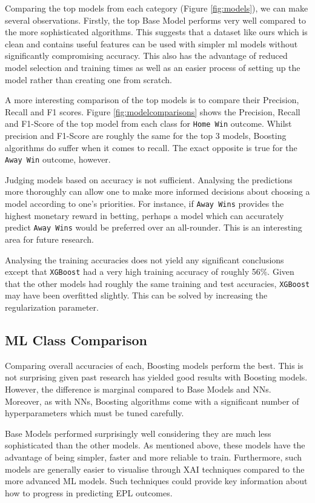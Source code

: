 \documentclass{article}
\newcommand{\sw}[1]{\texttt{#1}}
\begin{document}
Comparing the top models from each category (Figure \ref{fig:models}), we can make several observations. Firstly, the top Base Model performs very well compared to the more sophisticated algorithms. This suggests that a dataset like ours which is clean and contains useful features can be used with simpler \gls{ml} models without significantly compromising accuracy. This also has the advantage of reduced model selection and training times as well as an easier process of setting up the model rather than creating one from scratch.  

A more interesting comparison of the top models is to compare their Precision, Recall and F1 scores. Figure \ref{fig:modelcomparisons} shows the Precision, Recall and F1-Score of the top model from each class for \sw{Home Win} outcome. Whilst precision and F1-Score are roughly the same for the top 3 models, Boosting algorithms do suffer when it comes to recall. The exact opposite is true for the \sw{Away Win} outcome, however.  

Judging models based on accuracy is not sufficient. Analysing the predictions more thoroughly can allow one to make more informed decisions about choosing a model according to one’s priorities. For instance, if \sw{Away Wins} provides the highest monetary reward in betting, perhaps a model which can accurately predict \sw{Away Wins} would be preferred over an all-rounder. This is an interesting area for future research. 

Analysing the training accuracies does not yield any significant conclusions except that \sw{XGBoost} had a very high training accuracy of roughly 56\%. Given that the other models had roughly the same training and test accuracies, \sw{XGBoost} may have been overfitted slightly. This can be solved by increasing the regularization parameter. 

\subsection{ML Class Comparison} 
\label{classcomparison}

Comparing overall accuracies of each, Boosting models perform the best. This is not surprising given past research has yielded good results with Boosting models. However, the difference is marginal compared to Base Models and NNs. Moreover, as with NNs, Boosting algorithms come with a significant number of hyperparameters which must be tuned carefully. 

Base Models performed surprisingly well considering they are much less sophisticated than the other models. As mentioned above, these models have the advantage of being simpler, faster and more reliable to train. Furthermore, such models are generally easier to visualise through XAI techniques compared to the more advanced ML models. Such techniques could provide key information about how to progress in predicting EPL outcomes. 
\end{document}
